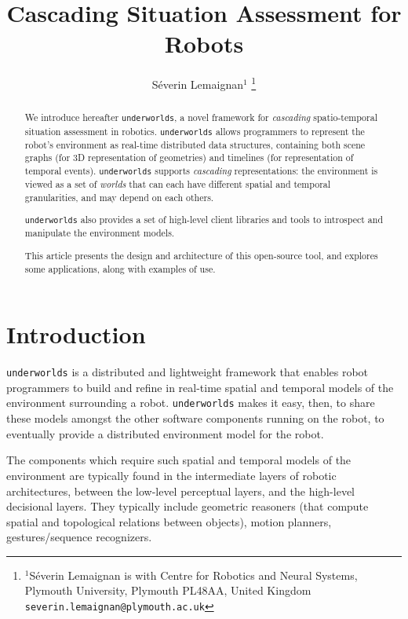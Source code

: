 \documentclass[letterpaper, 10 pt, conference]{ieeeconf}  %
\title{\LARGE \bf
Cascading Situation Assessment for Robots
}
\author{Séverin Lemaignan$^{1}$%
\thanks{$^{1}$Séverin Lemaignan is with Centre for Robotics and Neural Systems,
        Plymouth University, Plymouth PL48AA, United Kingdom
        {\tt\small severin.lemaignan@plymouth.ac.uk}}%
}
\newcommand{\uwds}{{\tt underworlds}\xspace}
\begin{document}
\maketitle
\thispagestyle{empty}
\pagestyle{empty}


\begin{abstract}

    We introduce hereafter \uwds, a novel framework for \emph{cascading}
    spatio-temporal situation assessment in robotics. \uwds allows programmers
    to represent the robot's environment as real-time distributed data
    structures, containing both scene graphs (for 3D representation of geometries)
    and timelines (for representation of temporal events). \uwds supports
    \emph{cascading} representations: the environment is viewed as a set of
    \emph{worlds} that can each have different spatial and temporal
    granularities, and may depend on each others.
    
    \uwds also provides a set of high-level client libraries and tools to introspect
    and manipulate the environment models.

    This article presents the design and architecture of this open-source tool,
    and explores some applications, along with examples of use.

\end{abstract}


\section{Introduction}


\uwds is a distributed and lightweight framework that enables robot programmers
to build and refine in real-time spatial and temporal models of the environment
surrounding a robot. \uwds makes it easy, then, to share these models amongst
the other software components running on the robot, to eventually provide a
distributed environment model for the robot.

The components which require such spatial and temporal models of the environment
are typically found in the intermediate layers of robotic architectures, between
the low-level perceptual layers, and the high-level decisional layers. They
typically include geometric reasoners (that compute spatial and topological
relations between objects), motion planners, gestures/sequence recognizers.
\end{document}
